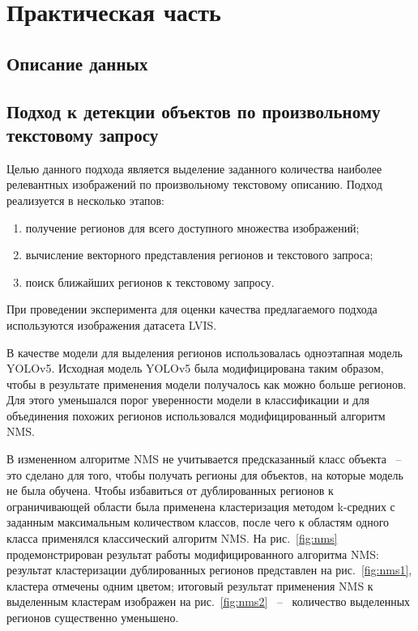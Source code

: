 \documentclass[a4paper,14pt]{article}
\begin{document}
    \newpage


    \section{Практическая часть}

    \subsection{Описание данных}

    \subsection{Подход к детекции объектов по произвольному текстовому запросу}

    Целью данного подхода является выделение заданного количества наиболее релевантных изображений по произвольному текстовому описанию.
    Подход реализуется в несколько этапов:
    \begin{enumerate}
        [1)]
        \itemsep0em
        \item получение регионов для всего доступного множества изображений;
        \item вычисление векторного представления регионов и текстового запроса;
        \item поиск ближайших регионов к текстовому запросу.
    \end{enumerate}

    При проведении эксперимента для оценки качества предлагаемого подхода используются изображения датасета LVIS.

    В качестве модели для выделения регионов использовалась одноэтапная модель YOLOv5.
    Исходная модель YOLOv5 была модифицирована таким образом, чтобы в результате применения модели получалось как можно больше регионов.
    Для этого уменьшался порог уверенности модели в классификации и для объединения похожих регионов использовался модифицированный алгоритм NMS.

    В измененном алгоритме NMS не учитывается предсказанный класс объекта ~--~ это сделано для того, чтобы получать регионы для объектов, на которые модель не была обучена.
    Чтобы избавиться от дублированных регионов к ограничивающей области была применена кластеризация методом k-средних с заданным максимальным количеством классов, после чего к областям одного класса применялся классический алгоритм NMS.
    На рис.~\ref{fig:nms} продемонстрирован результат работы модифицированного алгоритма NMS: результат кластеризации дублированных регионов представлен на рис.~\ref{fig:nms1}, кластера отмечены одним цветом; итоговый результат применения NMS к выделенным кластерам изображен на рис.~\ref{fig:nms2} ~--~ количество выделенных регионов существенно уменьшено.
\end{document}
